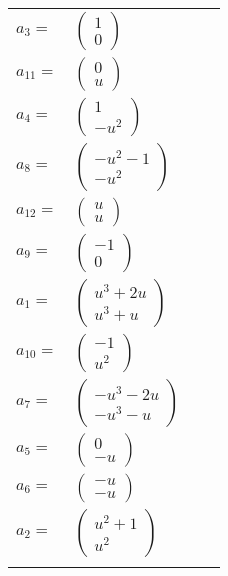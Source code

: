 \documentclass[1p]{elsarticle_modified}
\theoremstyle{definition}
\begin{document}
\begin{tabular}{m{7pt} m{180pt} m{7pt} m{180pt} }
\flushright $a_{3}=$&$\begin{pmatrix}1\\0\end{pmatrix}$ \\
\flushright $a_{11}=$&$\begin{pmatrix}0\\u\end{pmatrix}$ \\
\flushright $a_{4}=$&$\begin{pmatrix}1\\- u^2\end{pmatrix}$ \\
\flushright $a_{8}=$&$\begin{pmatrix}- u^2-1\\- u^2\end{pmatrix}$ \\
\flushright $a_{12}=$&$\begin{pmatrix}u\\u\end{pmatrix}$ \\
\flushright $a_{9}=$&$\begin{pmatrix}-1\\0\end{pmatrix}$ \\
\flushright $a_{1}=$&$\begin{pmatrix}u^3+2 u\\u^3+u\end{pmatrix}$ \\
\flushright $a_{10}=$&$\begin{pmatrix}-1\\u^2\end{pmatrix}$ \\
\flushright $a_{7}=$&$\begin{pmatrix}- u^3-2 u\\- u^3- u\end{pmatrix}$ \\
\flushright $a_{5}=$&$\begin{pmatrix}0\\- u\end{pmatrix}$ \\
\flushright $a_{6}=$&$\begin{pmatrix}- u\\- u\end{pmatrix}$ \\
\flushright $a_{2}=$&$\begin{pmatrix}u^2+1\\u^2\end{pmatrix}$\\&\end{tabular}
\end{document}
